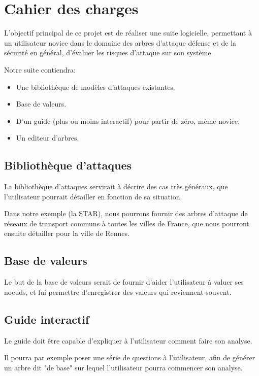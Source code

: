\chapter{Cahier des charges}
    L'objectif principal de ce projet est de réaliser une suite logicielle, permettant à un utilisateur novice dans le domaine des arbres d'attaque défense et de la sécurité en général, d'évaluer les risques d'attaque sur son système.
    
    Notre suite contiendra:
    \begin{itemize}
    	\item Une bibliothèque de modèles d'attaques existantes.
        \item Base de valeurs.
        \item D'un guide (plus ou moins interactif) pour partir de zéro, même novice.
        \item Un editeur d'arbres.
    \end{itemize}
    
    \section{Bibliothèque d'attaques}    
        La bibliothèque d'attaques servirait à décrire des cas très généraux, que l'utilisateur pourrait détailler en fonction de sa situation. 
        
        Dans notre exemple (la STAR), nous pourrons fournir des arbres d'attaque de réseaux de transport communs à toutes les villes de France, que nous pourront ensuite détailler pour la ville de Rennes.
        
    \section{Base de valeurs}
    	Le but de la base de valeurs serait de fournir d'aider l'utilisateur à valuer ses noeuds, et lui permettre d'enregistrer des valeurs qui reviennent souvent.
      
    \section{Guide interactif}
    	Le guide doit être capable d'expliquer à l'utilisateur comment faire son analyse. 
        
        Il pourra par exemple poser une série de questions à l'utilisateur, afin de générer un arbre dit "de base" sur lequel l'utilisateur pourra commencer son analyse.
        
